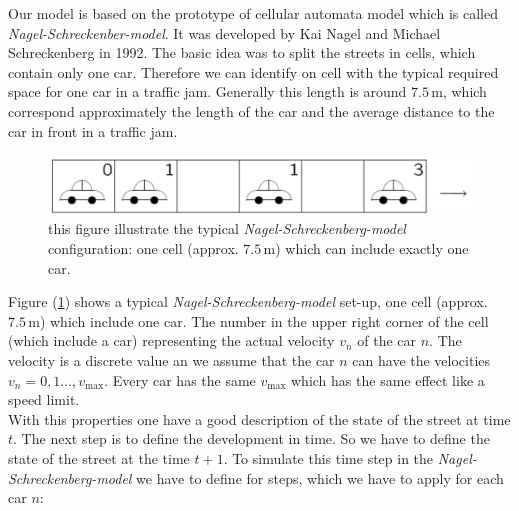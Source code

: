 \documentclass[11pt]{article}
\begin{document}
Our model is based on the prototype of cellular automata model which is called \textit{Nagel-Schreckenber-model}. It was developed by Kai Nagel and Michael Schreckenberg in 1992. The basic idea was to split the streets in cells, which contain only one car. Therefore we can identify on cell with the typical required space for one car in a traffic jam. Generally this length is around $7.5\,\mathrm{m}$, which correspond approximately the length of the car and the average distance to the car in front in a traffic jam.
\begin{figure}[h!]
\includegraphics[width=\textwidth]{ns_config.png}
\caption{this figure illustrate the typical \textit{Nagel-Schreckenberg-model} configuration: one cell (approx. $7.5\,\mathrm{m}$) which can include exactly one car.}
\label{ns_config} 
\end{figure}
Figure (\ref{ns_config}) shows a typical \textit{Nagel-Schreckenberg-model} set-up, one cell (approx. $7.5\,\mathrm{m}$) which include one car. The number in the upper right corner of the cell (which include a car) representing the actual velocity $v_n$ of the car $n$. The velocity is a discrete value an we assume that the car $n$ can have the velocities $v_n=0,1 \ldots ,v_{\mathrm{max}}$. Every car has the same $v_{\mathrm{max}}$ which has the same effect like a speed limit.\\
With this properties one have a good description of the state of the street at time $t$. The next step is to define the development in time. So we have to define the state of the street at the time $t+1$. To simulate this time step in the \textit{Nagel-Schreckenberg-model} we have to define for steps, which we have to apply for each car $n$:
\end{document}
